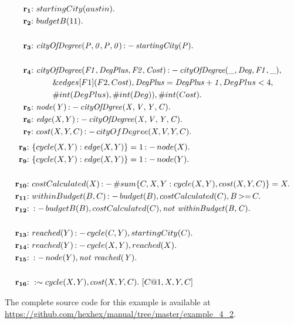 \documentclass[a4paper, titlepage]{article}
\newcommand{\ext}[3]{\ensuremath{\&{#1}[#2](#3)}}
\DeclareMathOperator{\leftimpl}{:-}
\DeclareMathOperator{\nott}{\mathit{not}}
\DeclareMathOperator{\geeq}{>=}
\newcommand{\examplelink}[1]{\url{https://github.com/hexhex/manual/tree/master/#1}}
\newcommand{\rowprefix}[1]{%
  \ensuremath{\color{black}\mathbf{#1{:}}\ }%
}
\begin{document}
\begin{exmp}
\label{travellingsalesperson}
\begin{align*}
\rowprefix{r_1} & startingCity(austin).\\
\rowprefix{r_2} & budgetB(11).\\
\\
\rowprefix{r_3} & \mathit{cityOfDegree(P,0,P,0)} \leftimpl 
\mathit{startingCity(P).} \\
& \\
\rowprefix{r_4} & \mathit{cityOfDegree(F1, DegPlus, F2, Cost)} 
\leftimpl \mathit{cityOfDegree(\_, Deg, F1, \_)}, \\
& \qquad \ext{edges}{F1}{F2, Cost}, \mathit{DegPlus=DegPlus+1}, 
DegPlus < 4, \\ & \qquad \#int(DegPlus), \#int(Deg)), \#int(Cost). 
\\
\rowprefix{r_5}& \mathit{node(Y)} \leftimpl 
\mathit{cityOfDgree(X, V, Y, C)}.\\
\rowprefix{r_6}& \mathit{edge}(X, Y) \leftimpl 
\mathit{cityOfDegree(X, V, Y, C).} \\
\rowprefix{r_7} & cost(X,Y,C) \leftimpl cityOfDegree(X, V, Y, C). 
\end{align*}
\begin{align*}
\rowprefix{r_8} & \{ cycle(X,Y) : edge(X,Y) \} = 1 \leftimpl 
node(X). \\
\rowprefix{r_9} &  \{ cycle(X,Y) : edge(X,Y) \} = 1 \leftimpl 
node(Y). \\
& \\
\rowprefix{r_{10}} & costCalculated(X) \leftimpl \#sum \{C,X,Y : 
cycle(X,Y), cost(X,Y,C)\} = X. \\
\rowprefix{r_{11}} & withinBudget(B,C) \leftimpl budget(B), 
costCalculated(C), B \geeq C. \\
\rowprefix{r_{12}} & \leftimpl  budgetB(B), costCalculated(C), 
\nott \thinspace \mathit{withinBudget(B,C).} \\
& \\
\rowprefix{r_{13}} & reached(Y) \leftimpl cycle(C, Y), startingCity(C). \\
\rowprefix{r_{14}} & reached(Y) \leftimpl cycle(X,Y), 
reached(X). \\
\rowprefix{r_{15}} & \leftimpl node(Y), \nott \thinspace 
\mathit{reached(Y)}. \\
& \\
\rowprefix{r_{16}} & :\sim cycle(X,Y), cost(X,Y,C). \ [C@1,X,Y,C] 
\end{align*}
\end{exmp}
The complete source code for this example is available at \examplelink{example_4_2}.
\end{document}
